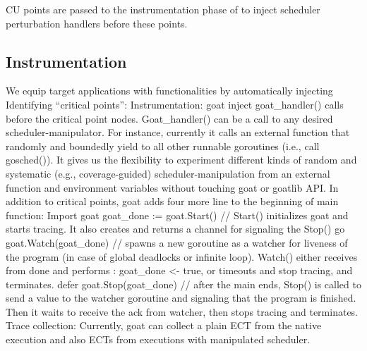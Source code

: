 CU points are passed to the instrumentation phase of \goat to inject scheduler perturbation handlers before these points.
%
%
%

\subsection{Instrumentation}
\label{sec:instrument}
We equip target applications with \goat functionalities by automatically injecting
Identifying “critical points”:
Instrumentation: goat inject goat\_handler() calls before the critical point nodes. Goat\_handler() can be a call to any desired scheduler-manipulator. For instance, currently it calls an external function that randomly and boundedly yield to all other runnable goroutines (i.e., call gosched()). It gives us the flexibility to experiment different kinds of random and systematic (e.g., coverage-guided) scheduler-manipulation from an external function and environment variables without touching goat or goatlib API. In addition to critical points, goat adds four more line to the beginning of main function:
Import goat
goat\_done := goat.Start() // Start() initializes goat and starts tracing. It also creates and returns a channel for signaling the Stop()
go goat.Watch(goat\_done) // spawns a new goroutine as a watcher for liveness of the program (in case of global deadlocks or infinite loop). Watch() either receives from done and performs : goat\_done <- true, or timeouts and stop tracing, and terminates.
defer goat.Stop(goat\_done) // after the main ends, Stop() is called to send a value to the watcher goroutine and signaling that the program is finished. Then it waits to receive the ack from watcher, then stops tracing and terminates.
Trace collection: Currently, goat can collect a plain ECT from the native execution and also ECTs from executions with manipulated scheduler.

